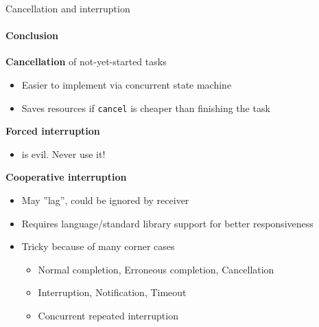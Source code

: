\begin{frame}{Cancellation and interruption}
\framesubtitle{Conclusion}

\textbf{Cancellation} of not-yet-started tasks
\begin{itemize}
  \item Easier to implement via concurrent state machine
  \item Saves resources if \texttt{cancel} is cheaper than finishing the task  
\end{itemize}

\textbf{Forced interruption}
\begin{itemize}
  \item is evil. Never use it!  
\end{itemize}

\textbf{Cooperative interruption}
\begin{itemize}
  \item May ''lag'', could be ignored by receiver
  \item Requires language/standard library support for better responsiveness
  \item Tricky because of many corner cases
    \begin{itemize}
        \item Normal completion, Erroneous completion, Cancellation
        \item Interruption, Notification, Timeout
        \item Concurrent repeated interruption
    \end{itemize}
\end{itemize}
\end{frame}

%
%
%


